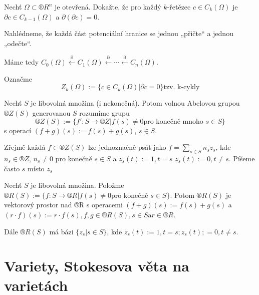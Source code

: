 \documentclass[12pt]{article}					%
\begin{document}
        \begin{priklad}
            Nechť $\Omega \subset ®R^n$ je otevřená. Dokažte, že pro každý $k$-řetězec $c \in C_k(\Omega)$ je $\partial c \in C_{k-1}(\Omega)$ a $\partial(\partial c) = 0$.

            \begin{dukaz}
                Nahlédneme, že každá část potenciální hranice se jednou „přičte“ a jednou „odečte“.
            \end{dukaz}
        \end{priklad}

        \begin{veta}
            Máme tedy $C_0(\Omega) \overset{\partial}{\leftarrow} C_1(\Omega) \overset{\partial}{\leftarrow} \cdots \overset{\partial}{\leftarrow} C_n(\Omega)$.

            Označme
            $$ Z_k(\Omega) := \{c \in C_k(\Omega) | \partial c = 0\} \text{tzv. k-cykly} $$
        \end{veta}

        \begin{poznamka}[Ze cvičení]
            Nechť $S$ je libovolná množina (i nekonečná). Potom volnou Abelovou grupou $®Z(S)$ generovanou $S$ rozumíme grupu
            $$ ®Z(S) := \{f': S\rightarrow ®Z| f(s)≠0 \text{pro konečně mnoho $s\in S$}\} $$
            s operací $(f + g)(s) := f(s) + g(s)$, $s \in S$.

            Zřejmě každá $f \in ®Z(S)$ lze jednoznačně psát jako $f = \sum_{s \in S}n_s z_s$, kde $n_s \in ®Z$, $n_s ≠ 0$ pro konečně $s\in S$ a $z_s(t):=1, t=s$ $z_s(t):= 0, t≠s$. Píšeme často $s$ místo $z_s$
        \end{poznamka}

        \begin{poznamka}[Ze cvičení]
            Nechť $S$ je libovolná množina. Položme $®R(S) := \{f: S \rightarrow ®R| f(s) ≠ 0 \text{pro konečně $s\in S$}\}$. Potom $®R(S)$ je vektorový prostor nad ®R s operacemi $(f+g)(s) := f(s) + g(s)$ a $(r·f)(s) := r·f(s), f, g \in ®R(S), s\in S \text{a} r\in ®R$.

            Dále $®R(S)$ má bázi $\{z_s | s \in S\}$, kde $z_s(t) := 1, t=s; z_s(t) ;= 0, t≠s$. 
        \end{poznamka}

\section{Variety, Stokesova věta na varietách}
\end{document}
